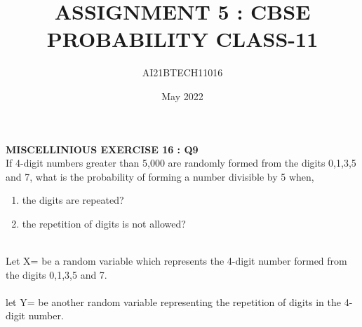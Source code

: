 \documentclass[journal,12pt,twocolumn]{IEEEtran}
\begin{document}
\makeatletter
{}
\makeatother
\let\StandardTheFigure\thefigure
\let\vec\mathbf
\def\putbox#1#2#3{\makebox[0in][l]{\makebox[#1][l]{}\raisebox{\baselineskip}[0in][0in]{\raisebox{#2}[0in][0in]{#3}}}}
     \def\rightbox#1{\makebox[0in][r]{#1}}
     \def\centbox#1{\makebox[0in]{#1}}
     \def\topbox#1{\raisebox{-\baselineskip}[0in][0in]{#1}}
     \def\midbox#1{\raisebox{-0.5\baselineskip}[0in][0in]{#1}}


\vspace{3cm}
       
\title{ASSIGNMENT 5 : CBSE PROBABILITY CLASS-11} 
\author{AI21BTECH11016} 
\date{May 2022}     


\maketitle

\newpage

\bigskip


\textbf{MISCELLINIOUS EXERCISE 16 : Q9}\\

\question If 4-digit numbers greater than 5,000 are randomly formed from the digits 0,1,3,5 and 7, what is the probability of forming a number divisible by 5 when,


\begin{enumerate}[label=(\roman*)]
\item the digits are repeated?
\item the repetition of digits is not allowed?
\end{enumerate}


\solution \\
Let X= be a random variable which represents the 4-digit number formed from the digits 0,1,3,5 and 7.\\\\
let Y= be another random variable representing the repetition of digits in the 4-digit number.\\

\begin{table}[ht!]
    \centering
    
    \caption{}
    \label{table:table1}
\end{table}
\end{document}
